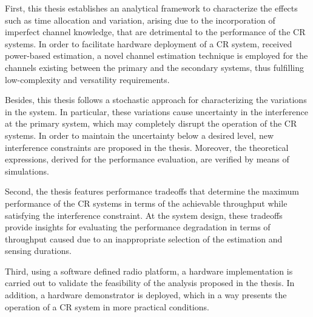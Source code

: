 First, this thesis establishes an analytical framework to characterize the effects such as time allocation and variation, arising due to the incorporation of imperfect channel knowledge, that are detrimental to the performance of the CR systems. In order to facilitate hardware deployment of a CR system, received power-based estimation, a novel channel estimation technique is employed for the channels existing between the primary and the secondary systems, thus fulfilling low-complexity and versatility requirements. 

Besides, this thesis follows a stochastic approach for characterizing the variations in the system. In particular, these variations cause uncertainty in the interference at the primary system, which may completely disrupt the operation of the CR systems. In order to maintain the uncertainty below a desired level, new interference constraints are proposed in the thesis. Moreover, the theoretical expressions, derived for the performance evaluation, are verified by means of simulations. 




Second, the thesis features performance tradeoffs that determine the maximum performance of the CR systems in terms of the achievable throughput while satisfying the interference constraint. At the system design, these tradeoffs provide insights for evaluating the performance degradation in terms of throughput caused due to an inappropriate selection of the estimation and sensing durations. 

Third, using a software defined radio platform, a hardware implementation is carried out to validate the feasibility of the analysis proposed in the thesis. In addition, a hardware demonstrator is deployed, which in a way presents the operation of a CR system in more practical conditions. %



\cleardoublepage
